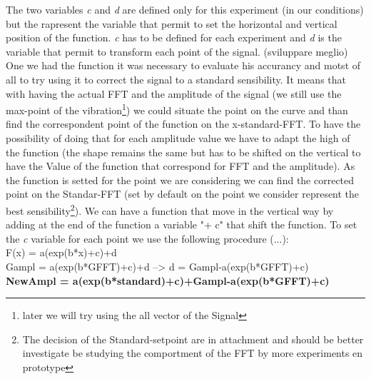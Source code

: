\documentclass[11pt, a4paper]{article}
\begin{document}
The two variables \textit{c} and \textit{d} are defined only for this experiment (in our conditions) but the rapresent the variable that permit to set the horizontal and vertical position of the function. \textit{c} has to be defined for each experiment and \textit{d} is the variable that permit to transform each point of the signal. (sviluppare meglio)
One we had the function it was necessary to evaluate his accurancy and motst of all to try using it to correct the signal to a standard sensibility. It means that with having the actual FFT and the amplitude of the signal (we still use the max-point of the vibration\footnote{later we will try using the all vector of the Signal}) we could situate the point on the curve and than find the correspondent point of the function on the x-standard-FFT. To have the possibility of doing that for each amplitude value we have to adapt the high of the function (the shape remains the same but has to be shifted on the vertical to have the Value of the function that correspond for FFT and the amplitude). As the function is setted for the point we are considering we can find the corrected point on the Standar-FFT (set by default on the point we consider represent the best sensibility\footnote{The decision of the Standard-setpoint are in attachment and should be better investigate be studying the comportment of the FFT by more experiments en prototype }). We can have a function that move in the vertical way by adding at the end of the function a variable "+ c" that shift the function. To set the \textit{c} variable for each point we use the following procedure (...): \\

F(x) = a(exp(b*x)+c)+d\\
Gampl = a(exp(b*GFFT)+c)+d  --> d = Gampl-a(exp(b*GFFT)+c)\\
\textbf{NewAmpl = a(exp(b*standard)+c)+Gampl-a(exp(b*GFFT)+c)}\\
\end{document}
